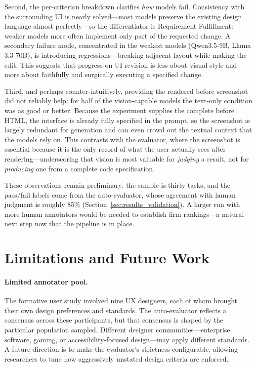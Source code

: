 \documentclass[sigconf,nonacm]{acmart}
\begin{document}
Second, the per-criterion breakdown clarifies \emph{how} models fail. Consistency with the surrounding UI is nearly solved—most models preserve the existing design language almost perfectly—so the differentiator is Requirement Fulfillment: weaker models more often implement only part of the requested change. A secondary failure mode, concentrated in the weakest models (Qwen3.5-9B, Llama 3.3 70B), is introducing regressions—breaking adjacent layout while making the edit. This suggests that progress on UI revision is less about visual style and more about faithfully and surgically executing a specified change.

Third, and perhaps counter-intuitively, providing the rendered before screenshot did not reliably help: for half of the vision-capable models the text-only condition was as good or better. Because the experiment supplies the complete before HTML, the interface is already fully specified in the prompt, so the screenshot is largely redundant for generation and can even crowd out the textual context that the models rely on. This contrasts with the evaluator, where the screenshot is essential because it is the only record of what the user actually sees after rendering—underscoring that vision is most valuable for \emph{judging} a result, not for \emph{producing} one from a complete code specification.

These observations remain preliminary: the sample is thirty tasks, and the pass/fail labels come from the auto-evaluator, whose agreement with human judgment is roughly 85\% (Section~\ref{sec:results_validation}). A larger run with more human annotators would be needed to establish firm rankings—a natural next step now that the pipeline is in place.

\section{Limitations and Future Work}
\label{sec:limitations}

\paragraph{Limited annotator pool.}
The formative user study involved nine UX designers, each of whom brought their own design preferences and standards. The auto-evaluator reflects a consensus across these participants, but that consensus is shaped by the particular population sampled. Different designer communities—enterprise software, gaming, or accessibility-focused design—may apply different standards. A future direction is to make the evaluator's strictness configurable, allowing researchers to tune how aggressively unstated design criteria are enforced.
\end{document}
